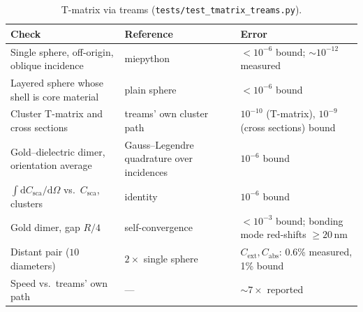 \documentclass[11pt]{article}
\newcommand{\code}[1]{\texttt{#1}}
\begin{document}
\begin{table}[ht]
\centering\small
\begin{tabularx}{\linewidth}{@{}Xll@{}}
\toprule
Check & Reference & Error \\
\midrule
Single sphere, off-origin, oblique incidence & miepython & $<10^{-6}$ bound; $\sim10^{-12}$ measured \\
Layered sphere whose shell is core material & plain sphere & $<10^{-6}$ bound \\
Cluster T-matrix and cross sections & treams' own cluster path & $10^{-10}$ (T-matrix), $10^{-9}$ (cross sections) bound \\
Gold--dielectric dimer, orientation average & Gauss--Legendre quadrature over incidences & $10^{-6}$ bound \\
$\int \mathrm{d}C_\mathrm{sca}/\mathrm{d}\Omega$ vs.\ $C_\mathrm{sca}$, clusters & identity & $10^{-6}$ bound \\
Gold dimer, gap $R/4$ & self-convergence & $<10^{-3}$ bound; bonding mode red-shifts $\ge20$\,nm \\
Distant pair ($10$ diameters) & $2\times$ single sphere & $C_\mathrm{ext},C_\mathrm{abs}$: 0.6\% measured, 1\% bound \\
Speed vs.\ treams' own path & --- & $\sim7\times$ reported \\
\bottomrule
\end{tabularx}
\caption{T-matrix via treams (\code{tests/test\_tmatrix\_treams.py}).}
\label{tab:val-tmatrix}
\end{table}
\end{document}
